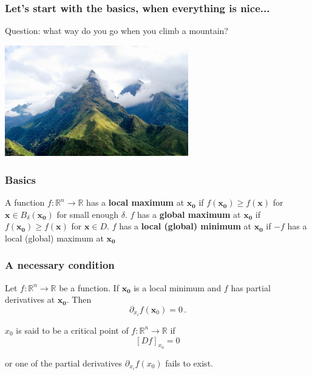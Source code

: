 \documentclass[aspectratio=169]{beamer}
\newcommand{\R}{\mathbb{R}}
\begin{document}
\begin{frame}
    \frametitle{Let's start with the basics, when everything is nice...}
    Question: what way do you go when you climb a mountain?

    \includegraphics[width = 0.6\textwidth]{fansipan.jpg} 

\end{frame}

\begin{frame}
    \frametitle{Basics}
\begin{definition}
A function \(f:\R^n \to \mathbb{R}\) has a \textbf{local maximum} at \(\mathbf{x_0}\) if
\(f(\mathbf{x_0}) \geq f(\mathbf{x})\) for \(\mathbf{x} \in B_\delta(\mathbf{x_0})\) for small enough \(\delta\).
\(f\) has a \textbf{global maximum} at \(\mathbf{x_0}\) if
\(f(\mathbf{x_0}) \geq f(\mathbf{x})\) for \(\mathbf{x} \in D\).
\(f\) has a \textbf{local (global) minimum} at \(\mathbf{x_0}\) if
\(-f\) has a local (global) maximum at \(\mathbf{x_0}\)
\end{definition}

\end{frame}


\begin{frame}
    \frametitle{A necessary condition}
\begin{theorem}
Let \(f:\R^n \to \mathbb{R}\) be a function.
If \(\mathbf{x_0}\) is a local minimum and \(f\) has partial derivatives at \(\mathbf{x_0}\).
Then
\begin{equation*}
    \partial_{x_i} f(\mathbf{x}_0) = 0 \,.
\end{equation*}
\end{theorem}
\end{frame}

\begin{frame}
    \begin{definition}
        $x_0$ is said to be a critical point of $f: \R^n \to \R$ if
        $$[D f]_{x_0} = 0$$
    \end{definition}
    or one of the partial derivatives $\partial_{x_i} f(x_0)$ fails to exist.
\end{frame}
\end{document}
